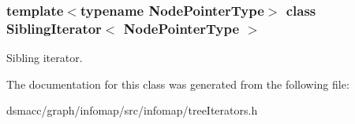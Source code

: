 \subsubsection*{template$<$typename Node\+Pointer\+Type$>$\newline
class Sibling\+Iterator$<$ Node\+Pointer\+Type $>$}

Sibling iterator. 

The documentation for this class was generated from the following file\+:\begin{DoxyCompactItemize}
\item 
dsmacc/graph/infomap/src/infomap/tree\+Iterators.\+h\end{DoxyCompactItemize}
